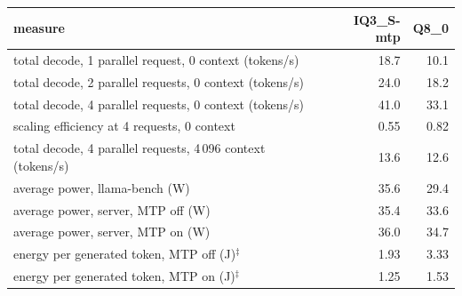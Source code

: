 \begin{tabular}{l rr}
\toprule
measure & IQ3\_S-mtp & Q8\_0 \\
\midrule
total decode, 1 parallel request, 0 context (tokens/s) & 18.7 & 10.1 \\
total decode, 2 parallel requests, 0 context (tokens/s) & 24.0 & 18.2 \\
total decode, 4 parallel requests, 0 context (tokens/s) & 41.0 & 33.1 \\
scaling efficiency at 4 requests, 0 context & 0.55 & 0.82 \\
total decode, 4 parallel requests, 4\,096 context (tokens/s) & 13.6 & 12.6 \\
\midrule
average power, llama-bench (W) & 35.6 & 29.4 \\
average power, server, MTP off (W) & 35.4 & 33.6 \\
average power, server, MTP on (W) & 36.0 & 34.7 \\
energy per generated token, MTP off (J)$^\ddagger$ & 1.93 & 3.33 \\
energy per generated token, MTP on (J)$^\ddagger$ & 1.25 & 1.53 \\
\bottomrule
\end{tabular}
